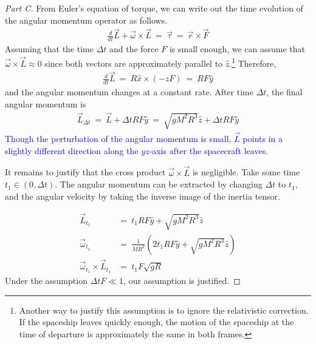\documentclass{article}
\numberwithin{equation}{section}
\newcommand{\deriv}[2]{
\frac {d {#1} } {d {#2}}
}
\begin{document}
\begin{proof}[Part C]
    From Euler's equation of torque, we can write 
    out the time evolution of the angular momentum 
    operator as follows. 
    \begin{align}
        \deriv{}{t}\vec L + \vec \omega \times \vec L  \ = \ \vec \tau \ = \ \vec r \times \vec F
    \end{align}
    Assuming that the time $\Delta t$ and the force $F$ is small enough, 
    we can assume that $\vec \omega \times \vec L \approx 0$ since both vectors are 
    approximately parallel to $\hat z$.\footnote{
        Another way to justify this assumption is to 
        ignore the relativistic correction. If 
        the spaceship leaves quickly enough, the motion 
        of the spaceship at the time of departure is 
        approximately the same in both frames. 
    } Therefore, 
    \begin{align}
        \deriv{}{t} \vec L \ = \ R \hat x \times (-z F) \ = \ RF \hat y
    \end{align}
    and the angular momentum changes at a constant rate. After time $\Delta t$, 
    the final angular momentum is 
    \begin{align}
        \vec L_{\Delta t} \ = \ \vec L + \Delta t RF \hat y \ = \ 
        \sqrt{g M^2 R^3} \hat z +  \Delta t RF \hat y
    \end{align}
    \textcolor{blue}{Though the perturbation of the angular momentum is small, $\vec L$ 
    points in a slightly different direction along the $yz$-axis after 
    the spacecraft leaves. }

    It remains to justify that the cross product $\vec \omega \times \vec L$ 
    is negligible. Take some time $t_1 \in (0, \Delta t)$. The angular momentum 
    can be extracted by changing $\Delta t$ to $t_1$, and the angular velocity by taking the 
    inverse image of the inertia tensor. 
    
    \begin{align}
        \vec L_{t_1} & = \ t_1 R F \hat y + \sqrt{g M^2 R^3} \hat z \\ 
        \vec \omega_{t_1} & = \ \frac 1 {MR^2} \left(
            2 t_1 RF \hat y + \sqrt{g M^2 R^3} \hat z
        \right) \\ 
        \vec\omega_{t_1}\times\vec L_{t_1} & = \ t_1 F \sqrt{g R}
    \end{align}
    Under the assumption $\Delta t F \ll 1$, our assumption is justified. 
\end{proof}
\end{document}
